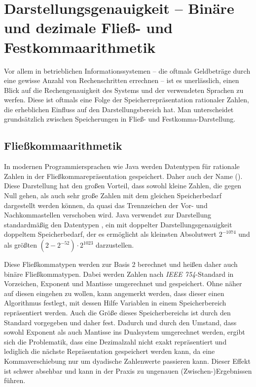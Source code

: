 \section{Darstellungsgenauigkeit -- Binäre und dezimale Fließ- und Festkommaarithmetik}\label{rechengenauigkeit}
Vor allem in betrieblichen Informationssystemen -- die oftmals Geldbeträge durch eine gewisse Anzahl von Rechenschritten errechnen -- ist es unerlässlich, einen Blick auf die Rechengenauigkeit des Systems und der verwendeten Sprachen zu werfen. Diese ist oftmals eine Folge der Speicherrepräsentation rationaler Zahlen, die erheblichen Einfluss auf den Darstellungsbereich hat. Man unterscheidet grundsätzlich zwischen Speicherungen in Fließ- und Festkomma-Darstellung.
 
\subsection*{Fließkommaarithmetik}
In modernen Programmiersprachen wie Java werden Datentypen für rationale Zahlen in der Fließkommarepräsentation gespeichert. Daher auch der Name  (\engl {}). Diese Darstellung hat den großen Vorteil, dass sowohl kleine Zahlen, die gegen Null gehen, als auch sehr große Zahlen mit dem gleichen Speicherbedarf dargestellt werden können, da quasi das Trennzeichen der Vor- und Nachkommastellen verschoben wird. Java verwendet zur Darstellung standardmäßig den Datentypen , ein  mit doppelter Darstellungsgenauigkeit \bzw doppeltem Speicherbedarf, der es ermöglicht als kleinsten Absolutwert $2^{-1074}$ und als größten $(2 - 2^{-52}) \cdot 2^{1023}$ darzustellen.

Diese Fließkommatypen werden zur Basis 2 berechnet und heißen daher auch binäre Fließkommatypen. Dabei werden Zahlen nach \textit{IEEE 754}-Standard in Vorzeichen, Exponent und Mantisse umgerechnet und gespeichert. Ohne näher auf diesen eingehen zu wollen, kann angemerkt werden, dass dieser einen Algorithmus festlegt, mit dessen Hilfe Variablen in einem Speicherbereich repräsentiert werden. Auch die Größe dieses Speicherbereichs ist durch den Standard vorgegeben und daher fest. Dadurch und durch den Umstand, dass sowohl Exponent als auch Mantisse ins Dualsystem umgerechnet werden, ergibt sich die Problematik, dass eine Dezimalzahl \uU nicht exakt repräsentiert und lediglich die nächste Repräsentation gespeichert werden kann, da eine Kommaverschiebung nur um dyadische Zahlenwerte passieren kann. Dieser Effekt ist schwer absehbar und kann in der Praxis zu ungenauen (Zwischen-)Ergebnissen führen.

